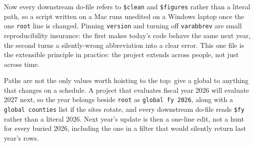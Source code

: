 Now every downstream do-file refers to \texttt{\$clean} and \texttt{\$figures} rather than a literal path, so a script written on a Mac runs unedited on a Windows laptop once the one \texttt{root} line is changed. Pinning \texttt{version} and turning off \texttt{varabbrev} are small reproducibility insurance: the first makes today's code behave the same next year, the second turns a silently-wrong abbreviation into a clear error. This one file is the extensible principle in practice: the project extends across people, not just across time.

Paths are not the only values worth hoisting to the top: give a global to anything that changes on a schedule. A project that evaluates fiscal year 2026 will evaluate 2027 next, so the year belongs beside \texttt{root} as \texttt{global fy 2026}, along with a \texttt{global counties} list if the sites rotate, and every downstream do-file reads \texttt{\$fy} rather than a literal 2026. Next year's update is then a one-line edit, not a hunt for every buried 2026, including the one in a filter that would silently return last year's rows.

